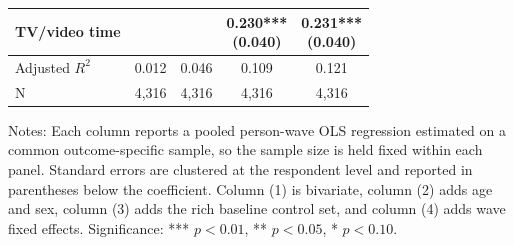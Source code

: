 \begin{table}[!htbp]
\begin{tabular}{lcccc}
TV/video time &  &  & \shortstack[c]{0.230*** \\[-0.35ex] (0.040)} & \shortstack[c]{0.231*** \\[-0.35ex] (0.040)}
\\
\hline
Adjusted $R^2$ & 0.012 & 0.046 & 0.109 & 0.121
\\
N & 4,316 & 4,316 & 4,316 & 4,316
\\
\hline
\end{tabular}
\renewcommand{\arraystretch}{1}
\begin{minipage}{0.95\textwidth}
\footnotesize Notes: Each column reports a pooled person-wave OLS regression estimated on a common outcome-specific sample, so the sample size is held fixed within each panel. Standard errors are clustered at the respondent level and reported in parentheses below the coefficient. Column (1) is bivariate, column (2) adds age and sex, column (3) adds the rich baseline control set, and column (4) adds wave fixed effects. Significance: *** \(p < 0.01\), ** \(p < 0.05\), * \(p < 0.10\).
\end{minipage}
\end{table}
